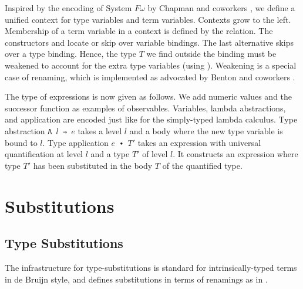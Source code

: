 \documentclass[acmsmall,anonymous,review,screen]{acmart}
\begin{document}
Inspired by the encoding of System $F\omega$ by Chapman and coworkers
\cite{DBLP:conf/mpc/ChapmanKNW19}, we define a 
unified context for type variables and term variables. Contexts grow to the left.
\TFTVEnv
Membership of a term variable in a context is defined by the
{\Ainn} relation.
\TFinn
The constructors {\Ahere} and {\Athere} locate or skip over variable bindings.
The last alternative {\Atskip} skips over a type binding. Hence, the type
$T$ we find outside the binding must be weakened to account for the
extra type variables (using {\ATwk}). Weakening is a special case of renaming, which
is implemented as advocated by Benton and coworkers \cite{DBLP:journals/jar/BentonHKM12}.

The type of expressions is now given as follows.
\TFExpr
We add numeric values and the successor function as examples of observables.
Variables, lambda abstractions, and application are encoded just like
for the simply-typed lambda calculus.
Type abstraction \texttt{Λ $l$ ⇒ $e$} takes a level $l$ and a body where the new type
variable is bound to $l$. 
Type application \texttt{$e$ ∙ $T'$} takes an expression with universal quantification at
level $l$ and a type $T'$ of level $l$. It constructs an expression
where type $T'$ has been substituted in the body $T$ of the
quantified type.

\section{Substitutions}
\label{sec:substitutions}

\subsection{Type Substitutions}
\label{sec:substitutions:type}

The infrastructure for type-substitutions is standard for
intrinsically-typed terms in de Bruijn
style, and defines substitutions in terms of renamings as in
\cite{DBLP:journals/jar/BentonHKM12, DBLP:journals/scp/KokkeSW20}.


\end{document}
